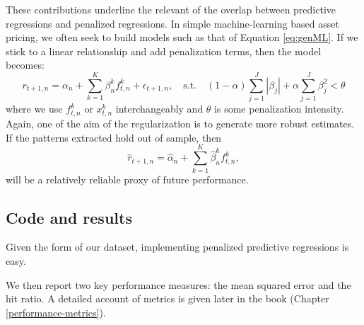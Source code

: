 \documentclass[]{krantz}
\makeatletter
\newenvironment{Shaded}{\begin{snugshade}}{\end{snugshade}}
\newcommand{\CommentTok}[1]{\textcolor[rgb]{0.37,0.37,0.37}{\textit{#1}}}
\newcommand{\DataTypeTok}[1]{\textcolor[rgb]{0.27,0.27,0.27}{#1}}
\newcommand{\FloatTok}[1]{\textcolor[rgb]{0.06,0.06,0.06}{#1}}
\newcommand{\KeywordTok}[1]{\textcolor[rgb]{0.27,0.27,0.27}{\textbf{#1}}}
\newcommand{\NormalTok}[1]{#1}
\newcommand{\OperatorTok}[1]{\textcolor[rgb]{0.43,0.43,0.43}{\textbf{#1}}}
\newcommand{\StringTok}[1]{\textcolor[rgb]{0.5,0.5,0.5}{#1}}
\newenvironment{kframe}{%
\medskip{}
\setlength{\fboxsep}{.8em}
 \def\at@end@of@kframe{}%
 \ifinner\ifhmode%
  \def\at@end@of@kframe{\end{minipage}}%
  \begin{minipage}{\columnwidth}%
 \fi\fi%
 \def\FrameCommand##1{\hskip\@totalleftmargin \hskip-\fboxsep
 \colorbox{shadecolor}{##1}\hskip-\fboxsep
     \hskip-\linewidth \hskip-\@totalleftmargin \hskip\columnwidth}%
 \MakeFramed {\advance\hsize-\width
   \@totalleftmargin\z@ \linewidth\hsize
   \@setminipage}}%
 {\par\unskip\endMakeFramed%
 \at@end@of@kframe}
\renewenvironment{Shaded}{\begin{kframe}}{\end{kframe}}
\theoremstyle{definition}
\theoremstyle{definition}
\theoremstyle{definition}
\theoremstyle{remark}
\makeatother
\begin{document}
These contributions underline the relevant of the overlap between
predictive regressions and penalized regressions. In simple
machine-learning based asset pricing, we often seek to build models such
as that of Equation \eqref{eq:genML}. If we stick to a linear relationship
and add penalization terms, then the model becomes:
\[r_{t+1,n} = \alpha_n + \sum_{k=1}^K\beta_n^kf^k_{t,n}+\epsilon_{t+1,n}, \quad \text{s.t.} \quad (1-\alpha)\sum_{j=1}^J |\beta_j| +\alpha\sum_{j=1}^J \beta_j^2< \theta\]
where we use \(f^k_{t,n}\) or \(x_{t,n}^k\) interchangeably and
\(\theta\) is some penalization intensity. Again, one of the aim of the
regularization is to generate more robust estimates. If the patterns
extracted hold out of sample, then
\[\hat{r}_{t+1,n} = \hat{\alpha}_n + \sum_{k=1}^K\hat{\beta}_n^kf^k_{t,n},\]
will be a relatively reliable proxy of future performance.

\hypertarget{code-and-results-1}{%
\subsection{Code and results}\label{code-and-results-1}}

Given the form of our dataset, implementing penalized predictive
regressions is easy.

\footnotesize

\begin{Shaded}
\end{Shaded}

\normalsize

We then report two key performance measures: the mean squared error and
the hit ratio. A detailed account of metrics is given later in the book
(Chapter \ref{performance-metrics}).

\footnotesize
\end{document}
